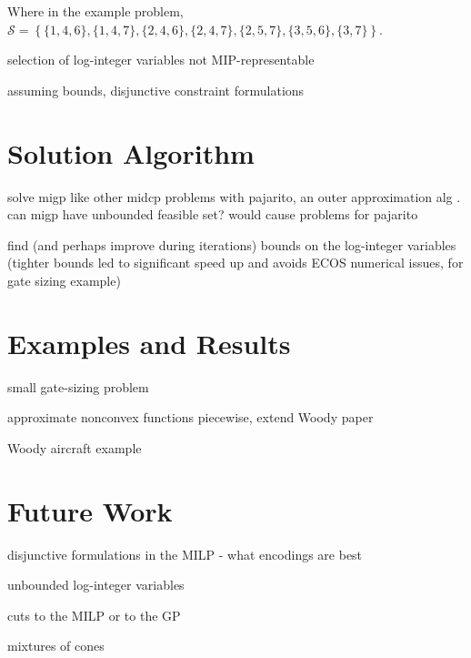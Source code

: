 \documentclass[]{article}
\begin{document}
Where in the example problem, $\mathcal{S} = \left\{ \{1,4,6\}, \{1,4,7\}, \{2,4,6\}, \{2,4,7\}, \{2,5,7\}, \{3,5,6\}, \{3,7\} \right\}$.

selection of log-integer variables not MIP-representable

assuming bounds, disjunctive constraint formulations



\section{Solution Algorithm}

solve migp like other midcp problems with pajarito, an outer approximation alg \cite{lubin15}. can migp have unbounded feasible set? would cause problems for pajarito

find (and perhaps improve during iterations) bounds on the log-integer variables (tighter bounds led to significant speed up and avoids ECOS numerical issues, for gate sizing example)



\section{Examples and Results}

small gate-sizing problem



approximate nonconvex functions piecewise, extend Woody paper \cite{hoburg14b}

Woody aircraft example



\section{Future Work}

disjunctive formulations in the MILP - what encodings are best

unbounded log-integer variables

cuts to the MILP or to the GP

mixtures of cones
\end{document}
